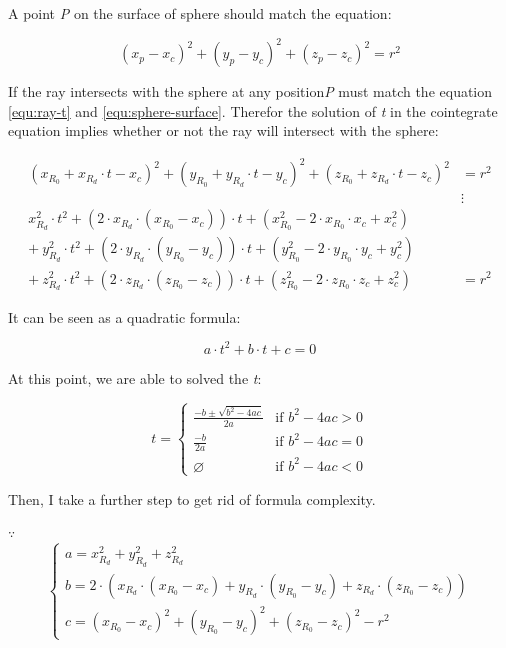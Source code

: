 A point \emph{P} on the surface of sphere should match the equation:

\begin{equation}\label{equ:sphere-surface}
(x_p - x_c)^2 + (y_p - y_c)^2 + (z_p - z_c)^2 = r^2
\end{equation}

If the ray intersects with the sphere at any position\emph{P} must match the equation \ref{equ:ray-t} and \ref{equ:sphere-surface}. Therefor the solution of \emph{t} in the cointegrate equation implies whether or not the ray will intersect with the sphere:

\[
\begin{aligned}
(x_{R_0} + x_{R_d} \cdot t - x_c)^2 + (y_{R_0} + y_{R_d} \cdot t - y_c)^2 + (z_{R_0} + z_{R_d} \cdot t - z_c)^2 &= r^2 \\
&\vdots \\
x_{R_d}^2 \cdot t^2 + (2 \cdot x_{R_d} \cdot (x_{R_0} - x_c)) \cdot t + (x_{R_0}^2 - 2 \cdot x_{R_0}\cdot x_c + x_c^2) & \\
+\ y_{R_d}^2 \cdot t^2 + (2 \cdot y_{R_d} \cdot (y_{R_0} - y_c)) \cdot t + (y_{R_0}^2 - 2 \cdot y_{R_0}\cdot y_c + y_c^2) & \\
+\ z_{R_d}^2 \cdot t^2 + (2 \cdot z_{R_d} \cdot (z_{R_0} - z_c)) \cdot t + (z_{R_0}^2 - 2 \cdot z_{R_0}\cdot z_c + z_c^2) &= r^2
\end{aligned}
\]

It can be seen as a quadratic formula:

\begin{equation}\label{equ:sphere-surface-quadratic-formula}
a \cdot t^2 + b \cdot t + c = 0
\end{equation}

At this point, we are able to solved the \emph{t}:

\[
t =
\begin{cases}
\frac{-b \pm \sqrt{b^2 - 4ac}}{2a} & \text{if } b^2 - 4ac > 0 \\
\frac{-b}{2a} & \text{if } b^2 - 4ac = 0 \\
\varnothing & \text{if } b^2 - 4ac < 0
\end{cases}
\]

Then, I take a further step to get rid of formula complexity.

$\because$
\[
\left\{
\begin{array}{lr}
a = x_{R_d}^2 + y_{R_d}^2 + z_{R_d}^2 \\
b = 2 \cdot (x_{R_d} \cdot (x_{R_0} - x_c) + y_{R_d} \cdot (y_{R_0} - y_c) + z_{R_d} \cdot (z_{R_0} - z_c)) \\
c = (x_{R_0} - x_c)^2 + (y_{R_0} - y_c)^2 + (z_{R_0} - z_c)^2 - r^2
\end{array}
\right.
\]

